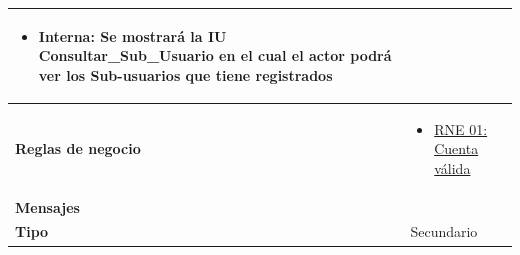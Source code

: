 \begin{center}
\begin{longtable}{| p{3.5cm} | p{11.5cm} |}
		\begin{itemize}
	              \item Interna: Se mostrará la IU Consultar_Sub_Usuario en el cual el actor podrá ver los Sub-usuarios que tiene registrados
	            \end{itemize} \\
        \hline
          \textbf{Reglas de negocio} & 
		\begin{itemize}
	         	  \item {\hyperref[rnr_01]{RNE 01: Cuenta válida}}
		 \end{itemize} \\
        \hline
          \textbf{Mensajes} & \\
        \hline
          \textbf{Tipo} & Secundario\\
        \hline      
  \end{longtable}
\end{center}
\endgroup


